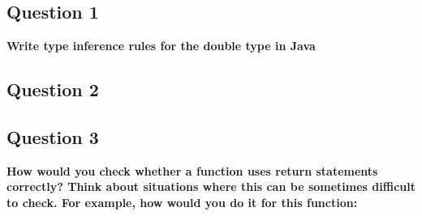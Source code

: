 \subsection{Question 1}
    \textbf{Write type inference rules for the double type in Java}

    

\subsection{Question 2}
    
    

\subsection{Question 3}
    \textbf{How would you check whether a function uses return statements correctly? Think about situations
where this can be sometimes difficult to check. For example, how would you do it for this function:}
    

    